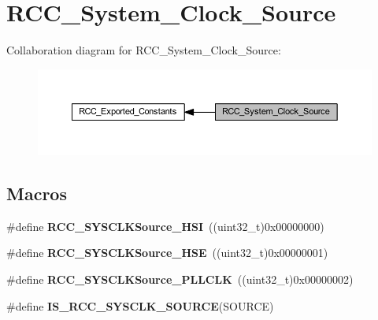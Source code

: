 \hypertarget{group___r_c_c___system___clock___source}{}\section{R\+C\+C\+\_\+\+System\+\_\+\+Clock\+\_\+\+Source}
\label{group___r_c_c___system___clock___source}
Collaboration diagram for R\+C\+C\+\_\+\+System\+\_\+\+Clock\+\_\+\+Source\+:
\nopagebreak
\begin{figure}[H]
\begin{center}
\leavevmode
\includegraphics[width=350pt]{group___r_c_c___system___clock___source}
\end{center}
\end{figure}
\subsection*{Macros}
\begin{DoxyCompactItemize}
\item 
\mbox{\label{group___r_c_c___system___clock___source_ga0f392254e74dd965c48edd5aad148e20}} 
\#define {\bfseries R\+C\+C\+\_\+\+S\+Y\+S\+C\+L\+K\+Source\+\_\+\+H\+SI}~((uint32\+\_\+t)0x00000000)
\item 
\mbox{\label{group___r_c_c___system___clock___source_gabeae110e41833842f8620647ea0ce85a}} 
\#define {\bfseries R\+C\+C\+\_\+\+S\+Y\+S\+C\+L\+K\+Source\+\_\+\+H\+SE}~((uint32\+\_\+t)0x00000001)
\item 
\mbox{\label{group___r_c_c___system___clock___source_ga9301b7a07a7cb8c2c6ed87b619c1c966}} 
\#define {\bfseries R\+C\+C\+\_\+\+S\+Y\+S\+C\+L\+K\+Source\+\_\+\+P\+L\+L\+C\+LK}~((uint32\+\_\+t)0x00000002)
\item 
\#define {\bfseries I\+S\+\_\+\+R\+C\+C\+\_\+\+S\+Y\+S\+C\+L\+K\+\_\+\+S\+O\+U\+R\+CE}(S\+O\+U\+R\+CE)
\end{DoxyCompactItemize}


